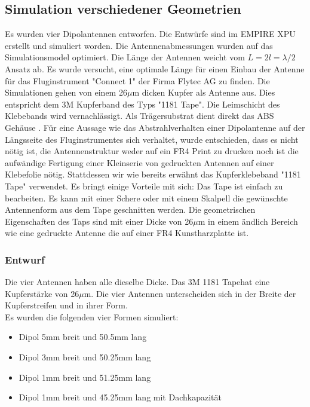 \subsection{Simulation  verschiedener Geometrien}
Es wurden vier Dipolantennen entworfen. Die Entwürfe sind im EMPIRE XPU erstellt und simuliert worden. Die Antennenabmessungen wurden auf das Simulationsmodel optimiert. Die Länge der Antennen weicht vom $L=2l=\lambda/2$ Ansatz ab. Es wurde versucht, eine optimale Länge für einen Einbau der Antenne für das Fluginstrument  "Connect 1" der Firma Flytec AG zu finden. Die Simulationen gehen von einem 26$\mu$m dicken Kupfer als Antenne aus. Dies entspricht dem 3M Kupferband des Typs "1181 Tape". Die Leimschicht des Klebebands wird vernachlässigt. Als Trägersubstrat dient direkt das ABS Gehäuse \cite{Kupferband}. Für eine Aussage wie das Abstrahlverhalten einer Dipolantenne auf der Längsseite des Fluginstrumentes sich verhaltet, wurde entschieden, dass es nicht nötig ist, die Antennenstruktur  weder auf ein FR4 Print zu drucken noch ist die aufwändige Fertigung einer Kleinserie von gedruckten Antennen auf einer Klebefolie nötig. Stattdessen wir wie bereits erwähnt das Kupferklebeband "1181 Tape" verwendet. Es bringt einige Vorteile mit sich: Das Tape ist einfach zu bearbeiten. Es kann mit einer Schere oder mit einem Skalpell die gewünschte Antennenform aus dem Tape geschnitten werden. Die geometrischen Eigenschaften des Taps sind mit einer Dicke von 26$\mu$m in einem ändlich Bereich wie eine gedruckte Antenne die auf einer FR4 Kunstharzplatte ist.
\newpage
\subsubsection*{Entwurf}
Die vier Antennen haben alle dieselbe Dicke. Das \glqq 3M 1181 Tape\grqq   hat eine Kupferstärke von 26$\mu$m. Die vier Antennen unterscheiden sich in der Breite der Kupferstreifen und in ihrer Form.\\
Es wurden die folgenden vier Formen simuliert:

\begin{itemize}
\item Dipol 5mm breit und 50.5mm lang
\item Dipol 3mm breit und 50.25mm lang
\item Dipol 1mm breit und 51.25mm lang
\item Dipol 1mm breit und 45.25mm lang mit Dachkapazität
\end{itemize}

